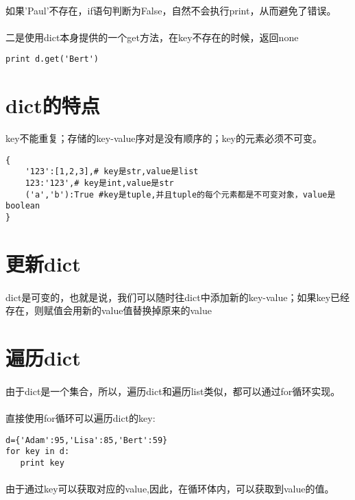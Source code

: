\documentclass{article}
\begin{document}
\begin{CJK}{UTF8}{gbsn}
\paragraph{}
如果'Paul'不存在，if语句判断为False，自然不会执行print，从而避免了错误。
\paragraph{}
二是使用dict本身提供的一个get方法，在key不存在的时候，返回none
\begin{verbatim}
print d.get('Bert')
\end{verbatim}
\section{dict的特点}
key不能重复；存储的key-value序对是没有顺序的；key的元素必须不可变。
\begin{verbatim}
{
    '123':[1,2,3],# key是str,value是list
    123:'123',# key是int,value是str
    ('a','b'):True #key是tuple,并且tuple的每个元素都是不可变对象，value是boolean
}
\end{verbatim}
\section{更新dict}
\paragraph{}
dict是可变的，也就是说，我们可以随时往dict中添加新的key-value；如果key已经存在，则赋值会用新的value值替换掉原来的value
\section{遍历dict}
\paragraph{}
由于dict是一个集合，所以，遍历dict和遍历list类似，都可以通过for循环实现。
\paragraph{}
直接使用for循环可以遍历dict的key:
\begin{verbatim}
d={'Adam':95,'Lisa':85,'Bert':59}
for key in d:
   print key
\end{verbatim}
\paragraph{}
由于通过key可以获取对应的value,因此，在循环体内，可以获取到value的值。

\end{CJK}
\end{document}
